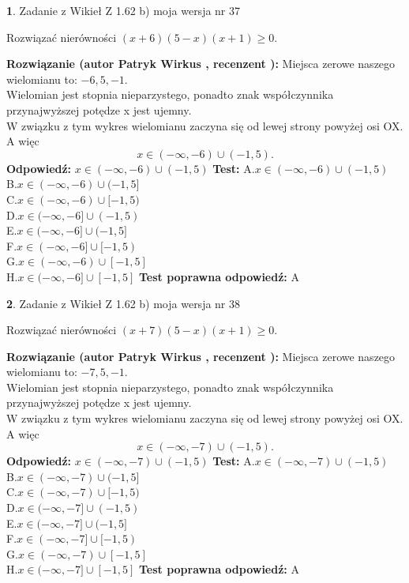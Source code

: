 \documentclass[12pt, a4paper]{article}
\theoremstyle{definition} %
\newtheorem{zad}{}
\newcommand{\zadStart}[1]{\begin{zad}#1\newline}
\newcommand{\zadStop}{\end{zad}}
\newcommand{\rozwStart}[2]{\noindent \textbf{Rozwiązanie (autor #1 , recenzent #2): }\newline}
\newcommand{\rozwStop}{\newline}
\newcommand{\odpStart}{\noindent \textbf{Odpowiedź:}\newline}
\newcommand{\odpStop}{\newline}
\newcommand{\testStart}{\noindent \textbf{Test:}\newline}
\newcommand{\testStop}{\newline}
\newcommand{\kluczStart}{\noindent \textbf{Test poprawna odpowiedź:}\newline}
\newcommand{\kluczStop}{\newline}
\begin{document}
\zadStart{Zadanie z Wikieł Z 1.62 b) moja wersja nr 37}

Rozwiązać nierówności $(x+6)(5-x)(x+1)\ge0$.
\zadStop
\rozwStart{Patryk Wirkus}{}
Miejsca zerowe naszego wielomianu to: $-6, 5, -1$.\\
Wielomian jest stopnia nieparzystego, ponadto znak współczynnika przy\linebreak najwyższej potędze x jest ujemny.\\ W związku z tym wykres wielomianu zaczyna się od lewej strony powyżej osi OX. A więc $$x \in (-\infty,-6) \cup (-1,5).$$
\rozwStop
\odpStart
$x \in (-\infty,-6) \cup (-1,5)$
\odpStop
\testStart
A.$x \in (-\infty,-6) \cup (-1,5)$\\
B.$x \in (-\infty,-6) \cup (-1,5]$\\
C.$x \in (-\infty,-6) \cup [-1,5)$\\
D.$x \in (-\infty,-6] \cup (-1,5)$\\
E.$x \in (-\infty,-6] \cup (-1,5]$\\
F.$x \in (-\infty,-6] \cup [-1,5)$\\
G.$x \in (-\infty,-6) \cup [-1,5]$\\
H.$x \in (-\infty,-6] \cup [-1,5]$
\testStop
\kluczStart
A
\kluczStop



\zadStart{Zadanie z Wikieł Z 1.62 b) moja wersja nr 38}

Rozwiązać nierówności $(x+7)(5-x)(x+1)\ge0$.
\zadStop
\rozwStart{Patryk Wirkus}{}
Miejsca zerowe naszego wielomianu to: $-7, 5, -1$.\\
Wielomian jest stopnia nieparzystego, ponadto znak współczynnika przy\linebreak najwyższej potędze x jest ujemny.\\ W związku z tym wykres wielomianu zaczyna się od lewej strony powyżej osi OX. A więc $$x \in (-\infty,-7) \cup (-1,5).$$
\rozwStop
\odpStart
$x \in (-\infty,-7) \cup (-1,5)$
\odpStop
\testStart
A.$x \in (-\infty,-7) \cup (-1,5)$\\
B.$x \in (-\infty,-7) \cup (-1,5]$\\
C.$x \in (-\infty,-7) \cup [-1,5)$\\
D.$x \in (-\infty,-7] \cup (-1,5)$\\
E.$x \in (-\infty,-7] \cup (-1,5]$\\
F.$x \in (-\infty,-7] \cup [-1,5)$\\
G.$x \in (-\infty,-7) \cup [-1,5]$\\
H.$x \in (-\infty,-7] \cup [-1,5]$
\testStop
\kluczStart
A
\kluczStop
\end{document}

